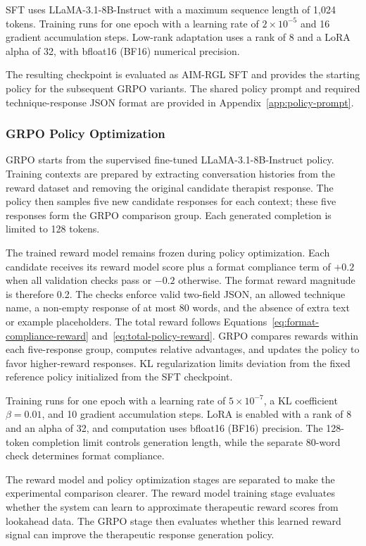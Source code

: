 SFT uses LLaMA-3.1-8B-Instruct with a maximum sequence length of 1,024 tokens. Training runs for one epoch with a learning rate of \(2\times10^{-5}\) and 16 gradient accumulation steps. Low-rank adaptation uses a rank of 8 and a LoRA alpha of 32, with bfloat16 (BF16) numerical precision.

The resulting checkpoint is evaluated as AIM-RGL SFT and provides the starting policy for the subsequent GRPO variants. The shared policy prompt and required technique-response JSON format are provided in Appendix~\ref{app:policy-prompt}.

\subsubsection{GRPO Policy Optimization}

GRPO starts from the supervised fine-tuned LLaMA-3.1-8B-Instruct policy. Training contexts are prepared by extracting conversation histories from the reward dataset and removing the original candidate therapist response. The policy then samples five new candidate responses for each context; these five responses form the GRPO comparison group. Each generated completion is limited to 128 tokens.

The trained reward model remains frozen during policy optimization. Each candidate receives its reward model score plus a format compliance term of \(+0.2\) when all validation checks pass or \(-0.2\) otherwise. The format reward magnitude is therefore 0.2. The checks enforce valid two-field JSON, an allowed technique name, a non-empty response of at most 80 words, and the absence of extra text or example placeholders. The total reward follows Equations~\ref{eq:format-compliance-reward} and~\ref{eq:total-policy-reward}. GRPO compares rewards within each five-response group, computes relative advantages, and updates the policy to favor higher-reward responses. KL regularization limits deviation from the fixed reference policy initialized from the SFT checkpoint.

Training runs for one epoch with a learning rate of \(5\times10^{-7}\), a KL coefficient \(\beta=0.01\), and 10 gradient accumulation steps. LoRA is enabled with a rank of 8 and an alpha of 32, and computation uses bfloat16 (BF16) precision. The 128-token completion limit controls generation length, while the separate 80-word check determines format compliance.

The reward model and policy optimization stages are separated to make the experimental comparison clearer. The reward model training stage evaluates whether the system can learn to approximate therapeutic reward scores from lookahead data. The GRPO stage then evaluates whether this learned reward signal can improve the therapeutic response generation policy.

